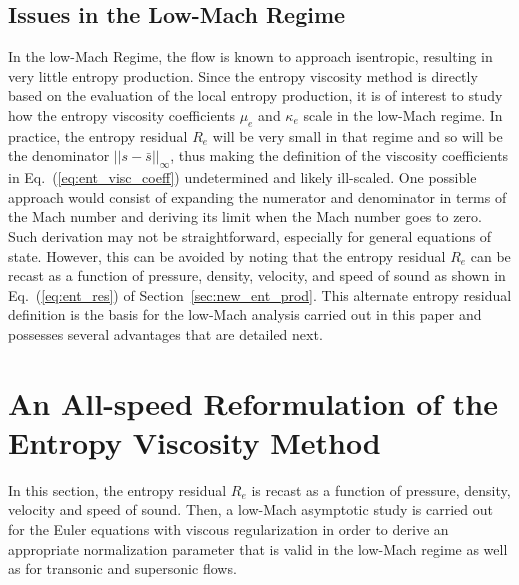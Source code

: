 \documentclass[preprint,10pt]{elsarticle}
\newcommand{\resi}{R_e}
\newcommand{\eqt}[1]{Eq.~(\ref{#1})}                     %
\newcommand{\sct}[1]{Section~\ref{#1}}                   %
\begin{document}
\subsection{Issues in the Low-Mach Regime} 

In the low-Mach Regime, the flow is known to approach isentropic, resulting in very little entropy production. Since the entropy viscosity method is directly based on the evaluation of the local entropy production, it is of interest to study how the entropy viscosity coefficients $\mu_e$ and $\kappa_e$ scale in the low-Mach regime. In practice, the entropy residual $\resi$ will be very small in that regime and so will be the denominator $|| s - \bar{s} ||_\infty$, thus making the definition of the viscosity coefficients in \eqt{eq:ent_visc_coeff} undetermined and likely ill-scaled.  One possible approach would consist of expanding the numerator and denominator in terms of the Mach number and deriving its limit when the Mach number goes to zero. Such derivation may not be straightforward, especially for general equations of state. However, this can be avoided by noting that the entropy residual $\resi$ can be recast as a function of pressure, density, velocity, and speed of sound as shown in \eqt{eq:ent_res} of \sct{sec:new_ent_prod}. This alternate entropy residual definition is the basis for the low-Mach analysis carried out in this paper and possesses several advantages that are detailed next. %

\section{An All-speed Reformulation of the Entropy Viscosity Method} \label{sec:extension}

In this section, the entropy residual $\resi$ is recast as a function of pressure, density, velocity and speed of sound. Then, a low-Mach asymptotic study is carried out for the Euler equations with viscous regularization in order to derive an appropriate normalization parameter that is valid in the low-Mach regime as well as for transonic and supersonic flows. 
\end{document}
